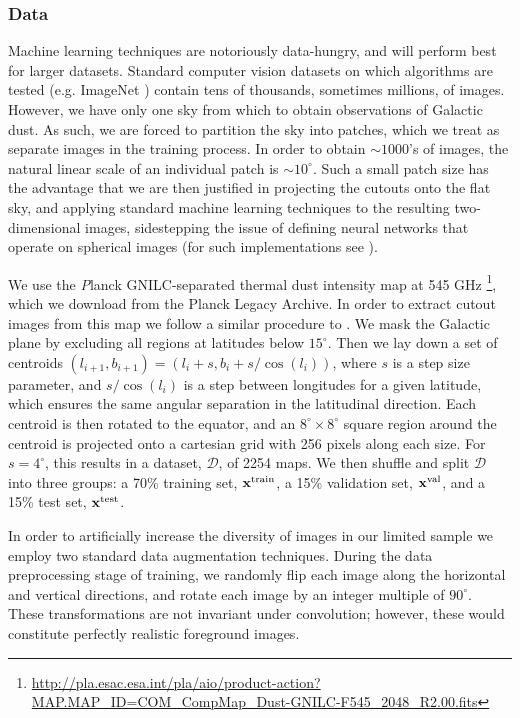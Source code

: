 \documentclass[fleqn,usenatbib]{mnras}
\begin{document}
\subsubsection{Data}
\label{sec:data} 

Machine learning techniques are notoriously data-hungry, and will perform best for larger datasets. Standard computer vision datasets on which algorithms are tested (e.g. ImageNet \citep{imagenet}) contain tens of thousands, sometimes millions, of images. However, we have only one sky from which to obtain observations of Galactic dust. As such, we are forced to partition the sky into patches, which we treat as separate images in the training process. In order to obtain $\sim 1000$'s of images, the natural linear scale of an individual patch is $\sim 10^\circ$. Such a small patch size has the advantage that we are then justified in projecting the cutouts onto the flat sky, and applying standard machine learning techniques to the resulting two-dimensional images, sidestepping the issue of defining neural networks that operate on spherical images (for such implementations see \cite{perraudin/etal:2019,krachmalnicoff/tomasi:2019}). 

We use the {\emph Planck} GNILC-separated thermal dust intensity map at 545 GHz \footnote{{\url{http://pla.esac.esa.int/pla/aio/product-action?MAP.MAP_ID=COM_CompMap_Dust-GNILC-F545_2048_R2.00.fits}}}, which we download from the Planck Legacy Archive. In order to extract cutout images from this map we follow a similar procedure to \cite{aylor/etal:2019}. We mask the Galactic plane by excluding all regions at latitudes below $15^\circ$. Then we lay down a set of centroids $(l_{i+1}, b_{i+1}) = (l_i + s, b_i + s / \cos(l_i))$, where $s$ is a step size parameter, and $s/\cos(l_i)$ is a step between longitudes for a given latitude, which ensures the same angular separation in the latitudinal direction. Each centroid is then rotated to the equator, and an $8^\circ \times 8^\circ$ square region around the centroid is projected onto a cartesian grid with 256 pixels along each size. For $s=4^\circ$, this results in a dataset, $\mathcal D$, of 2254 maps. We then shuffle and split $\mathcal D$ into three groups: a 70\% training set, $\mathbf x^{\rm train}$, a 15\% validation set, $\mathbf x^{\rm val}$, and a 15\% test set, $\mathbf x^{\rm test}$. 

In order to artificially increase the diversity of images in our limited sample we employ two standard data augmentation techniques. During the data preprocessing stage of training, we randomly flip each image along the horizontal and vertical directions, and rotate each image by an integer multiple of $90^{\circ}$. These transformations are not invariant under convolution; however, these would constitute perfectly realistic foreground images.
\end{document}
